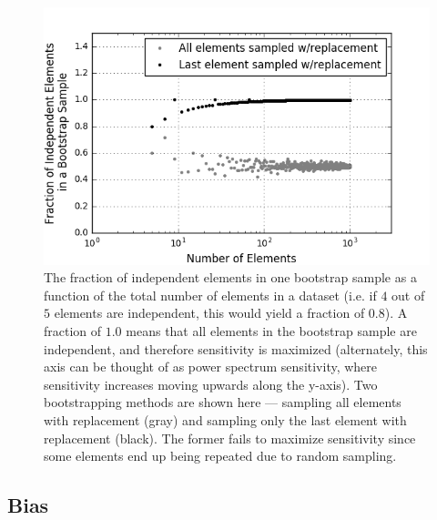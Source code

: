 \documentclass[preprint2,numberedappendix,tighten]{aastex6}  %
\begin{document}
\begin{figure}
	\centering
	\includegraphics[trim={0.3cm 0cm 0.3cm 0.3cm},width=\columnwidth]{plots/toy_error2.png}
	\caption{The fraction of independent elements in one bootstrap sample as a function of the total number of elements in a 
dataset (i.e. if $4$ out of $5$ elements are independent, this would yield a fraction of $0.8$). A fraction of $1.0$ means that all 
elements in the bootstrap sample are independent, and therefore sensitivity is maximized (alternately, this axis can be thought 
of as power spectrum sensitivity, where sensitivity increases moving upwards along the y-axis). Two bootstrapping methods are shown here --- sampling all elements with replacement (gray) and sampling only the last element with replacement (black). The former fails to maximize sensitivity since some elements end up being repeated due to random sampling.} 
	\label{fig:toy_error2}
\end{figure}


\subsection{Bias}
\label{sec:BiasOverview}
\end{document}
